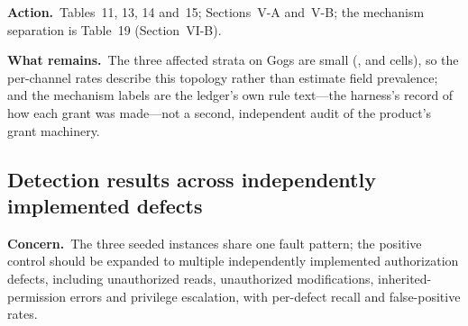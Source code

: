 \documentclass[10pt,letterpaper]{article}
\newcommand{\Concern}[1]{\par\smallskip\noindent\textbf{Concern.}\ #1\par}
\newcommand{\Action}[1]{\par\smallskip\noindent\textbf{Action.}\ #1\par}
\newcommand{\Remains}[1]{\par\smallskip\noindent\textbf{What remains.}\ #1\par}
\begin{document}
\Action{Tables~11, 13, 14 and~15; Sections~V-A and~V-B; the mechanism
separation is Table~19 (Section~VI-B).}
\Remains{The three affected strata on Gogs are small (\GgChSrcTeam{},
\GgChSrcPublic{} and \GgChSrcSiteAdmin{} cells), so the per-channel rates describe
this topology rather than estimate field prevalence; and the mechanism labels are
the ledger's own rule text---the harness's record of how each grant was made---not
a second, independent audit of the product's grant machinery.}

\subsection{Detection results across independently implemented defects}
\Concern{The three seeded instances share one fault pattern; the positive control
should be expanded to multiple independently implemented authorization defects,
including unauthorized reads, unauthorized modifications, inherited-permission
errors and privilege escalation, with per-defect recall and false-positive
rates.}
\end{document}
